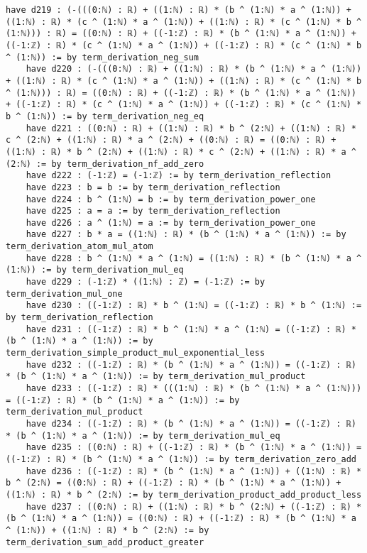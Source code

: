 \documentclass{article}
\begin{document}
\begin{tcolorbox}[colback=white!10, width=\linewidth]
\begin{lstlisting}[language=Lean4]
    have d219 : (-(((0:ℕ) : ℝ) + ((1:ℕ) : ℝ) * (b ^ (1:ℕ) * a ^ (1:ℕ)) + ((1:ℕ) : ℝ) * (c ^ (1:ℕ) * a ^ (1:ℕ)) + ((1:ℕ) : ℝ) * (c ^ (1:ℕ) * b ^ (1:ℕ))) : ℝ) = ((0:ℕ) : ℝ) + ((-1:ℤ) : ℝ) * (b ^ (1:ℕ) * a ^ (1:ℕ)) + ((-1:ℤ) : ℝ) * (c ^ (1:ℕ) * a ^ (1:ℕ)) + ((-1:ℤ) : ℝ) * (c ^ (1:ℕ) * b ^ (1:ℕ)) := by term_derivation_neg_sum
    have d220 : (-(((0:ℕ) : ℝ) + ((1:ℕ) : ℝ) * (b ^ (1:ℕ) * a ^ (1:ℕ)) + ((1:ℕ) : ℝ) * (c ^ (1:ℕ) * a ^ (1:ℕ)) + ((1:ℕ) : ℝ) * (c ^ (1:ℕ) * b ^ (1:ℕ))) : ℝ) = ((0:ℕ) : ℝ) + ((-1:ℤ) : ℝ) * (b ^ (1:ℕ) * a ^ (1:ℕ)) + ((-1:ℤ) : ℝ) * (c ^ (1:ℕ) * a ^ (1:ℕ)) + ((-1:ℤ) : ℝ) * (c ^ (1:ℕ) * b ^ (1:ℕ)) := by term_derivation_neg_eq
    have d221 : ((0:ℕ) : ℝ) + ((1:ℕ) : ℝ) * b ^ (2:ℕ) + ((1:ℕ) : ℝ) * c ^ (2:ℕ) + ((1:ℕ) : ℝ) * a ^ (2:ℕ) + ((0:ℕ) : ℝ) = ((0:ℕ) : ℝ) + ((1:ℕ) : ℝ) * b ^ (2:ℕ) + ((1:ℕ) : ℝ) * c ^ (2:ℕ) + ((1:ℕ) : ℝ) * a ^ (2:ℕ) := by term_derivation_nf_add_zero
    have d222 : (-1:ℤ) = (-1:ℤ) := by term_derivation_reflection
    have d223 : b = b := by term_derivation_reflection
    have d224 : b ^ (1:ℕ) = b := by term_derivation_power_one
    have d225 : a = a := by term_derivation_reflection
    have d226 : a ^ (1:ℕ) = a := by term_derivation_power_one
    have d227 : b * a = ((1:ℕ) : ℝ) * (b ^ (1:ℕ) * a ^ (1:ℕ)) := by term_derivation_atom_mul_atom
    have d228 : b ^ (1:ℕ) * a ^ (1:ℕ) = ((1:ℕ) : ℝ) * (b ^ (1:ℕ) * a ^ (1:ℕ)) := by term_derivation_mul_eq
    have d229 : (-1:ℤ) * ((1:ℕ) : ℤ) = (-1:ℤ) := by term_derivation_mul_one
    have d230 : ((-1:ℤ) : ℝ) * b ^ (1:ℕ) = ((-1:ℤ) : ℝ) * b ^ (1:ℕ) := by term_derivation_reflection
    have d231 : ((-1:ℤ) : ℝ) * b ^ (1:ℕ) * a ^ (1:ℕ) = ((-1:ℤ) : ℝ) * (b ^ (1:ℕ) * a ^ (1:ℕ)) := by term_derivation_simple_product_mul_exponential_less
    have d232 : ((-1:ℤ) : ℝ) * (b ^ (1:ℕ) * a ^ (1:ℕ)) = ((-1:ℤ) : ℝ) * (b ^ (1:ℕ) * a ^ (1:ℕ)) := by term_derivation_mul_product
    have d233 : ((-1:ℤ) : ℝ) * (((1:ℕ) : ℝ) * (b ^ (1:ℕ) * a ^ (1:ℕ))) = ((-1:ℤ) : ℝ) * (b ^ (1:ℕ) * a ^ (1:ℕ)) := by term_derivation_mul_product
    have d234 : ((-1:ℤ) : ℝ) * (b ^ (1:ℕ) * a ^ (1:ℕ)) = ((-1:ℤ) : ℝ) * (b ^ (1:ℕ) * a ^ (1:ℕ)) := by term_derivation_mul_eq
    have d235 : ((0:ℕ) : ℝ) + ((-1:ℤ) : ℝ) * (b ^ (1:ℕ) * a ^ (1:ℕ)) = ((-1:ℤ) : ℝ) * (b ^ (1:ℕ) * a ^ (1:ℕ)) := by term_derivation_zero_add
    have d236 : ((-1:ℤ) : ℝ) * (b ^ (1:ℕ) * a ^ (1:ℕ)) + ((1:ℕ) : ℝ) * b ^ (2:ℕ) = ((0:ℕ) : ℝ) + ((-1:ℤ) : ℝ) * (b ^ (1:ℕ) * a ^ (1:ℕ)) + ((1:ℕ) : ℝ) * b ^ (2:ℕ) := by term_derivation_product_add_product_less
    have d237 : ((0:ℕ) : ℝ) + ((1:ℕ) : ℝ) * b ^ (2:ℕ) + ((-1:ℤ) : ℝ) * (b ^ (1:ℕ) * a ^ (1:ℕ)) = ((0:ℕ) : ℝ) + ((-1:ℤ) : ℝ) * (b ^ (1:ℕ) * a ^ (1:ℕ)) + ((1:ℕ) : ℝ) * b ^ (2:ℕ) := by term_derivation_sum_add_product_greater

\end{lstlisting}
\end{tcolorbox}
\end{document}
